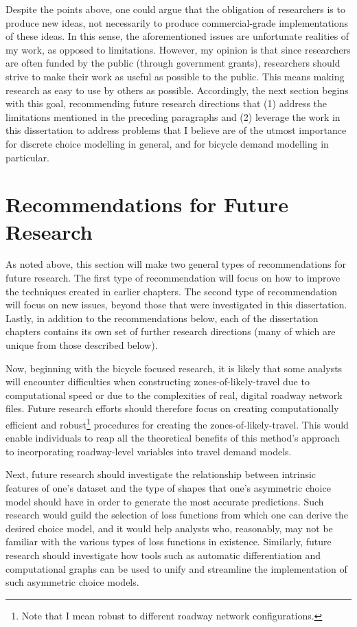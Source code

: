 \documentclass{article}
\begin{document}
Despite the points above, one could argue that the obligation of researchers is to produce new ideas, not necessarily to produce commercial-grade implementations of these ideas. In this sense, the aforementioned issues are unfortunate realities of my work, as opposed to limitations. However, my opinion is that since researchers are often funded by the public (through government grants), researchers should strive to make their work as useful as possible to the public. This means making research as easy to use by others as possible. Accordingly, the next section begins with this goal, recommending future research directions that (1) address the limitations mentioned in the preceding paragraphs and (2) leverage the work in this dissertation to address problems that I believe are of the utmost importance for discrete choice modelling in general, and for bicycle demand modelling in particular. 

\section{Recommendations for Future Research}
As noted above, this section will make two general types of recommendations for future research. The first type of recommendation will focus on how to improve the techniques created in earlier chapters. The second type of recommendation will focus on new issues, beyond those that were investigated in this dissertation. Lastly, in addition to the recommendations below, each of the dissertation chapters contains its own set of further research directions (many of which are unique from those described below).

Now, beginning with the bicycle focused research, it is likely that some analysts will encounter difficulties when constructing zones-of-likely-travel due to computational speed or due to the complexities of real, digital roadway network files. Future research efforts should therefore focus on creating computationally efficient and robust\footnote{Note that I mean robust to different roadway network configurations.} procedures for creating the zones-of-likely-travel. This would enable individuals to reap all the theoretical benefits of this method's approach to incorporating roadway-level variables into travel demand models.

Next, future research should investigate the relationship between intrinsic features of one's dataset and the type of shapes that one's asymmetric choice model should have in order to generate the most accurate predictions. Such research would guild the selection of loss functions from which one can derive the desired choice model, and it would help analysts who, reasonably, may not be familiar with the various types of loss functions in existence. Similarly, future research should investigate how tools such as automatic differentiation and computational graphs can be used to unify and streamline the implementation of such asymmetric choice models.
\end{document}
